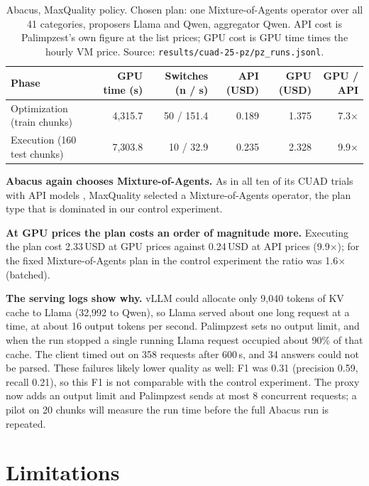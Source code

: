 \documentclass[11pt,a4paper]{article}
\newcommand{\code}[1]{\texttt{#1}}
\begin{document}
\begin{table}[h]
\centering\small
\begin{tabular}{@{}lrrrrr@{}}
\toprule
Phase & GPU time (s) & Switches (n / s) & API (USD) & GPU (USD) & GPU / API \\
\midrule
Optimization (train chunks) & 4,315.7 & 50 / 151.4 & 0.189 & 1.375 & 7.3$\times$ \\
Execution (160 test chunks)              & 7,303.8 & 10 / 32.9  & 0.235 & 2.328 & 9.9$\times$ \\
\bottomrule
\end{tabular}
\caption{Abacus, MaxQuality policy. Chosen plan: one Mixture-of-Agents operator over all 41
categories, proposers Llama and Qwen, aggregator Qwen. API cost is Palimpzest's own figure at the list
prices; GPU cost is GPU time times the hourly VM price. Source: \code{results/cuad-25-pz/pz\_runs.jsonl}.}
\label{tab:abacus}
\end{table}

\textbf{Abacus again chooses Mixture-of-Agents.} As in all ten of its CUAD trials with API models
\cite{russo2025abacus}, MaxQuality selected a Mixture-of-Agents operator, the plan type that is
dominated in our control experiment.

\textbf{At GPU prices the plan costs an order of magnitude more.} Executing the plan cost
2.33\,USD at GPU prices against 0.24\,USD at API prices (9.9$\times$); for the fixed
Mixture-of-Agents plan in the control experiment the ratio was 1.6$\times$ (batched).

\textbf{The serving logs show why.} vLLM could allocate only 9,040 tokens of KV cache to Llama
(32,992 to Qwen), so Llama served about one long request at a time, at about 16 output tokens per
second. Palimpzest sets no output limit, and when the run stopped a single running Llama request occupied about 90\% of that cache. The
client timed out on 358 requests after 600\,s, and 34 answers could not be parsed. These failures
likely lower quality as well: F1 was 0.31 (precision 0.59, recall 0.21), so this F1 is not comparable with the
control experiment. The proxy now adds an output limit and Palimpzest sends at most 8 concurrent
requests; a pilot on 20 chunks will measure the run time before the full Abacus run is repeated.

\section{Limitations}
\end{document}
